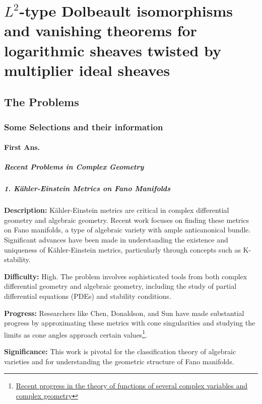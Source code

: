 \documentclass[lang=en,12pt]{beautybook}
\begin{document}
\part{\texorpdfstring{$L^2$}{}-type Dolbeault isomorphisms and vanishing theorems for logarithmic sheaves twisted by multiplier ideal sheaves}
\chapter{The Problems}
\section{Some Selections and their information}
\subsection{First Ans.}

\subsubsection*{Recent Problems in Complex Geometry}

\subsubsection*{1. Kähler-Einstein Metrics on Fano Manifolds}

\textbf{Description:} 
Kähler-Einstein metrics are critical in complex differential geometry and algebraic geometry. Recent work focuses on finding these metrics on Fano manifolds, a type of algebraic variety with ample anticanonical bundle. Significant advances have been made in understanding the existence and uniqueness of Kähler-Einstein metrics, particularly through concepts such as K-stability.

\textbf{Difficulty:} 
High. The problem involves sophisticated tools from both complex differential geometry and algebraic geometry, including the study of partial differential equations (PDEs) and stability conditions.

\textbf{Progress:} 
Researchers like Chen, Donaldson, and Sun have made substantial progress by approximating these metrics with cone singularities and studying the limits as cone angles approach certain values\footnote{\href{https://link.springer.com/article/10.1134/S0040577924010112}{Recent progress in the theory of functions of several complex variables and complex geometry}}.

\textbf{Significance:} 
This work is pivotal for the classification theory of algebraic varieties and for understanding the geometric structure of Fano manifolds.
\end{document}
